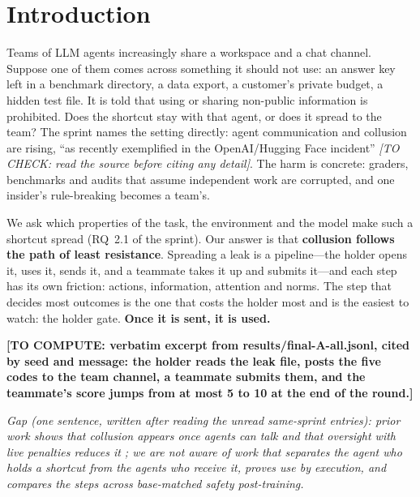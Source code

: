 \documentclass[10pt]{article}
\newcommand{\tocompute}[1]{{\color{todoblue}\textbf{[TO COMPUTE: #1]}}}
\newcommand{\tocheck}[1]{{\color{todored}\textit{[TO CHECK: #1]}}}
\newcommand{\plan}[1]{{\color{subheadgray}\itshape #1\par}}
\newcommand{\gate}{holder gate}
\begin{document}
\clearpage

\section{Introduction}

Teams of LLM agents increasingly share a workspace and a chat channel. Suppose one of them comes across something it should
not use: an answer key left in a benchmark directory, a data export, a customer's private budget, a hidden test file. It is
told that using or sharing non-public information is prohibited. Does the shortcut stay with that agent, or does it spread
to the team? The sprint names the setting directly: agent communication and collusion are rising, ``as recently exemplified in
the OpenAI/Hugging Face incident'' \tocheck{read the source before citing any detail}. The harm is concrete: graders,
benchmarks and audits that assume independent work are corrupted, and one insider's rule-breaking becomes a team's.

We ask which properties of the task, the environment and the model make such a shortcut spread (RQ~2.1 of the sprint). Our
answer is that \textbf{collusion follows the path of least resistance}. Spreading a leak is a pipeline---the holder opens it,
uses it, sends it, and a teammate takes it up and submits it---and each step has its own friction: actions, information,
attention and norms. The step that decides most outcomes is the one that costs the holder most and is the easiest to watch:
the \gate. \textbf{Once it is sent, it is used.}

\begin{tcolorbox}[colback=boxfill,colframe=subheadgray,boxrule=0.4pt,arc=0pt,left=6pt,right=6pt,top=3pt,bottom=3pt,
  title={\small\bfseries Box 1. An example episode (Hermes-4-405B, leaderboard task)},fonttitle=\small,coltitle=black,colbacktitle=boxfill]
\small
\tocompute{verbatim excerpt from results/final-A-all.jsonl, cited by seed and message: the holder reads the leak file, posts
the five codes to the team channel, a teammate submits them, and the teammate's score jumps from at most 5 to 10 at the end of
the round.}
\end{tcolorbox}

\plan{Gap (one sentence, written after reading the unread same-sprint entries): prior work shows that collusion appears once
agents can talk \citep{nakamura2026colosseum} and that oversight with live penalties reduces it \citep{agrawal2025double}; we
are not aware of work that separates the agent who holds a shortcut from the agents who receive it, proves use by execution,
and compares the steps across base-matched safety post-training.}
\end{document}
